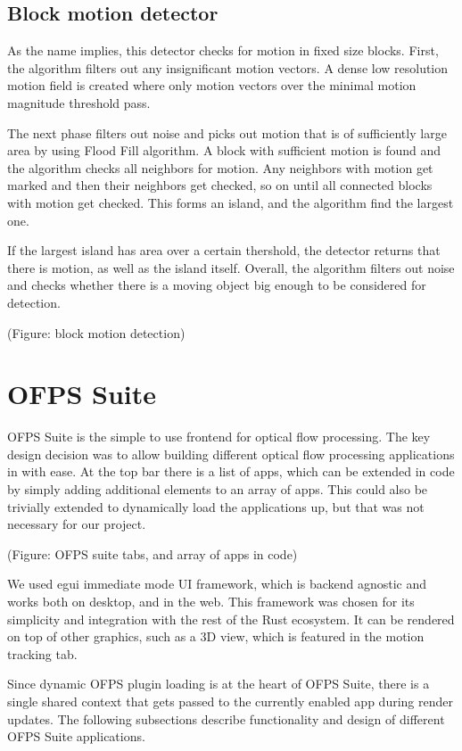 \documentclass[11pt,english]{report}
\begin{document}
\subsection{Block motion detector}

As the name implies, this detector checks for motion in fixed size blocks. First, the algorithm filters out any insignificant motion vectors. A dense low resolution motion field is created where only motion vectors over the minimal motion magnitude threshold pass.

The next phase filters out noise and picks out motion that is of sufficiently large area by using Flood Fill algorithm. A block with sufficient motion is found and the algorithm checks all neighbors for motion. Any neighbors with motion get marked and then their neighbors get checked, so on until all connected blocks with motion get checked. This forms an island, and the algorithm find the largest one.

If the largest island has area over a certain thershold, the detector returns that there is motion, as well as the island itself. Overall, the algorithm filters out noise and checks whether there is a moving object big enough to be considered for detection.

(Figure: block motion detection)

\section{OFPS Suite}

OFPS Suite is the simple to use frontend for optical flow processing. The key design decision was to allow building different optical flow processing applications in with ease. At the top bar there is a list of apps, which can be extended in code by simply adding additional elements to an array of apps. This could also be trivially extended to dynamically load the applications up, but that was not necessary for our project.

(Figure: OFPS suite tabs, and array of apps in code)

We used egui\cite{egui} immediate mode UI framework, which is backend agnostic and works both on desktop, and in the web. This framework was chosen for its simplicity and integration with the rest of the Rust ecosystem. It can be rendered on top of other graphics, such as a 3D view, which is featured in the motion tracking tab.

Since dynamic OFPS plugin loading is at the heart of OFPS Suite, there is a single shared context that gets passed to the currently enabled app during render updates. The following subsections describe functionality and design of different OFPS Suite applications.
\end{document}

